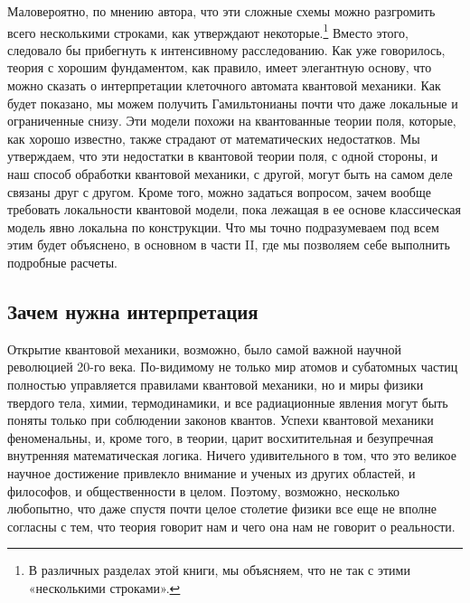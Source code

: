 \documentclass[main.tex]{subfiles}
\begin{document}
Маловероятно, по мнению автора, что эти сложные схемы можно разгромить всего несколькими строками, как утверждают некоторые.\footnote{В различных разделах этой книги, мы объясняем, что не так с этими «несколькими строками».} Вместо этого, следовало бы прибегнуть к интенсивному расследованию. Как уже говорилось, теория с хорошим фундаментом, как правило, имеет элегантную основу, что можно сказать о интерпретации клеточного автомата квантовой механики. Как будет показано, мы можем получить Гамильтонианы почти что даже локальные и ограниченные снизу. Эти модели похожи на квантованные теории поля, которые, как хорошо известно, также страдают от математических недостатков. Мы утверждаем, что эти недостатки в квантовой теории поля, с одной стороны, и наш способ обработки квантовой механики, с другой, могут быть на самом деле связаны друг с другом. Кроме того, можно задаться вопросом, зачем вообще требовать локальности квантовой модели, пока лежащая в ее основе классическая модель явно локальна по конструкции. Что мы точно подразумеваем под всем этим будет объяснено, в основном в части II, где мы позволяем себе выполнить подробные расчеты.

\subsection{Зачем нужна интерпретация}\label{ch1.1}

Открытие квантовой механики, возможно, было самой важной научной революцией 20-го века. По-видимому не только мир атомов и субатомных частиц полностью управляется правилами квантовой механики, но и миры физики твердого тела, химии, термодинамики, и все радиационные явления могут быть поняты только при соблюдении законов квантов. Успехи квантовой механики феноменальны, и, кроме того, в теории, царит восхитительная и безупречная внутренняя математическая логика. Ничего удивительного в том, что это великое научное достижение привлекло внимание и ученых из других областей, и философов, и общественности в целом. Поэтому, возможно, несколько любопытно, что даже спустя почти целое столетие физики все еще не вполне согласны с тем, что теория говорит нам и чего она нам не говорит о реальности. 
\end{document}
